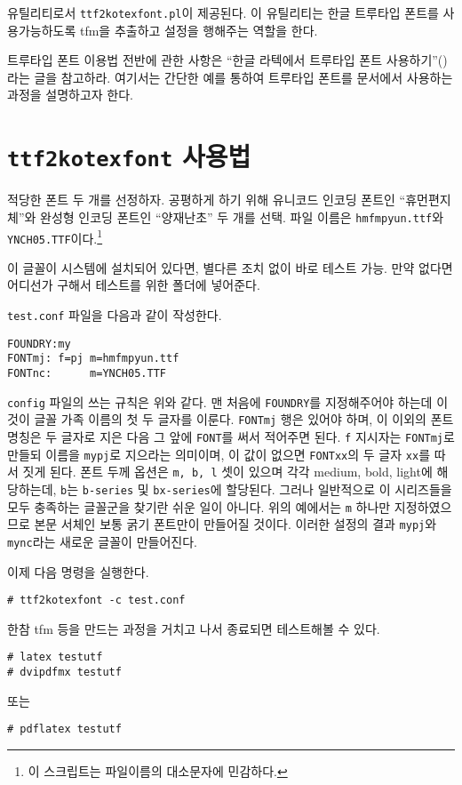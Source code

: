 \kotex{} 유틸리티로서 \texttt{ttf2kotexfont.pl}이 제공된다.
이 유틸리티는 한글 트루타입 폰트를 사용가능하도록 tfm을 추출하고
설정을 행해주는 역할을 한다.

트루타입 폰트 이용법 전반에 관한 사항은 ``한글 라텍에서 트루타입
폰트 사용하기''(\cite{karnes2007b})라는 글을 참고하라. 여기서는 간단한 예를 통하여
트루타입 폰트를 문서에서 사용하는 과정을 설명하고자 한다.

\section{\texttt{ttf2kotexfont} 사용법}

적당한 폰트 두 개를 선정하자. 
공평하게 하기 위해 유니코드 인코딩 폰트인 ``휴먼편지체''와 완성형 인코딩 폰트인 ``양재난초'' 두 개를 선택. 파일 이름은 \texttt{hmfmpyun.ttf}와 \texttt{YNCH05.TTF}이다.\footnote{이 스크립트는 파일이름의 대소문자에 민감하다.}

이 글꼴이 시스템에 설치되어 있다면, 별다른 조치 없이 바로 테스트 가능. 만약 없다면 어디선가 구해서 테스트를 위한 폴더에 넣어준다.

\texttt{test.conf} 파일을 다음과 같이 작성한다.
\begin{verbatim}
FOUNDRY:my
FONTmj: f=pj m=hmfmpyun.ttf
FONTnc:      m=YNCH05.TTF
\end{verbatim}
\texttt{config} 파일의 쓰는 규칙은 위와 같다. 맨 처음에 \texttt{FOUNDRY}를
지정해주어야 하는데 이것이 글꼴 가족 이름의 첫 두 글자를 이룬다.
\texttt{FONTmj} 행은  있어야 하며, 이 이외의 폰트
명칭은 두 글자로 지은 다음 그 앞에 \texttt{FONT}를 써서 적어주면 된다.
\texttt{f} 지시자는 \texttt{FONTmj}로 만들되 이름을 \texttt{mypj}로
지으라는 의미이며, 이 값이 없으면 \texttt{FONTxx}의 두 글자 \texttt{xx}를
따서 짓게 된다. 폰트 두께 옵션은 \texttt{m, b, l} 셋이 있으며 각각
medium, bold, light에 해당하는데, \texttt{b}는 \texttt{b-series} 및
\texttt{bx-series}에 할당된다. 그러나 일반적으로 이 시리즈들을 모두
충족하는 글꼴군을 찾기란 쉬운 일이 아니다. 위의 예에서는 \texttt{m} 하나만
지정하였으므로 본문 서체인 보통 굵기 폰트만이 만들어질 것이다. 이러한
설정의 결과 \texttt{mypj}와 \texttt{mync}라는 새로운 글꼴이
만들어진다. 

이제 다음 명령을 실행한다.
\begin{verbatim}
# ttf2kotexfont -c test.conf
\end{verbatim}

한참 tfm 등을 만드는 과정을 거치고 나서 종료되면 테스트해볼 수 있다. 
\begin{verbatim}
# latex testutf
# dvipdfmx testutf
\end{verbatim}
또는
\begin{verbatim}
# pdflatex testutf
\end{verbatim}

